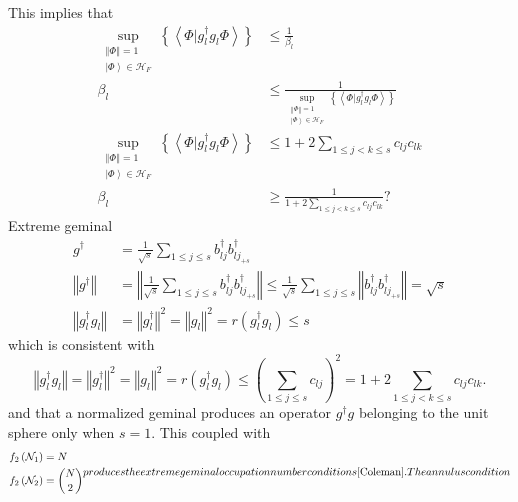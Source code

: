 \documentclass[aps,preprint]{revtex4}%
\begin{document}
This implies that
\begin{align}
\sup_{\substack{\left\Vert \Phi\right\Vert =1\\\left\vert \Phi\right\rangle
\in\mathcal{H}_{F}}}\left\{  \left\langle \left.  \Phi\right\vert
g_{l}^{\dagger}g_{l}\Phi\right\rangle \right\}   &  \leq\frac{1}{\beta_{l}}\\
\beta_{l}  &  \leq\frac{1}{\sup_{\substack{\left\Vert \Phi\right\Vert
=1\\\left\vert \Phi\right\rangle \in\mathcal{H}_{F}}}\left\{  \left\langle
\left.  \Phi\right\vert g_{l}^{\dagger}g_{l}\Phi\right\rangle \right\}  }\\
\sup_{\substack{\left\Vert \Phi\right\Vert =1\\\left\vert \Phi\right\rangle
\in\mathcal{H}_{F}}}\left\{  \left\langle \left.  \Phi\right\vert
g_{l}^{\dagger}g_{l}\Phi\right\rangle \right\}   &  \leq1+2\sum_{1\leq j<k\leq
s}c_{lj}c_{lk}\\
\beta_{l}  &  \geq\frac{1}{1+2\sum_{1\leq j<k\leq s}c_{lj}c_{lk}}?
\end{align}
Extreme geminal
\begin{align}
g^{\dagger}  &  =\frac{1}{\sqrt{s}}\sum_{1\leq j\leq s}b_{lj}^{\dagger
}b_{lj_{+s}}^{\dagger}\nonumber\\
\left\Vert g^{\dagger}\right\Vert  &  =\left\Vert \frac{1}{\sqrt{s}}%
\sum_{1\leq j\leq s}b_{lj}^{\dagger}b_{lj_{+s}}^{\dagger}\right\Vert \leq
\frac{1}{\sqrt{s}}\sum_{1\leq j\leq s}\left\Vert b_{lj}^{\dagger}b_{lj_{+s}%
}^{\dagger}\right\Vert =\sqrt{s}\nonumber\\
\left\Vert g_{l}^{\dagger}g_{l}\right\Vert  &  =\left\Vert g_{l}^{\dagger
}\right\Vert ^{2}=\left\Vert g_{l}\right\Vert ^{2}=r\left(  g_{l}^{\dagger
}g_{l}\right)  \leq s
\end{align}
which is consistent with
\begin{equation}
\left\Vert g_{l}^{\dagger}g_{l}\right\Vert =\left\Vert g_{l}^{\dagger
}\right\Vert ^{2}=\left\Vert g_{l}\right\Vert ^{2}=r\left(  g_{l}^{\dagger
}g_{l}\right)  \leq\left(  \sum_{1\leq j\leq s}c_{lj}\right)  ^{2}%
=1+2\sum_{1\leq j<k\leq s}c_{lj}c_{lk}.
\end{equation}
and that a normalized geminal produces an operator $g^{\dagger}g$ belonging to
the unit sphere only when $s=1.$ This coupled with
\begin{subequations}
\label{NumCon}%
\begin{align}
f_{2}\left(  \mathcal{N}_{1}\right)   &  =N\\
f_{2}\left(  \mathcal{N}_{2}\right)   &  =\binom{N}{2}%
\end{align}
produces the extreme geminal occupation number conditions \cite{Coleman}.

The annulus condition
\end{subequations}
\end{document}
